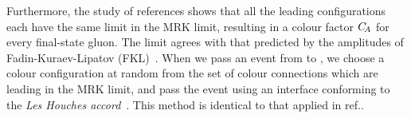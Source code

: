 Furthermore, the study of references \cite{DelDuca:1993pp,DelDuca:1995zy} shows
that all the leading configurations each have the same limit in the
MRK limit, resulting in a colour
factor $C_{\!A}$ for every final-state gluon. The limit agrees with that
predicted by the amplitudes of Fadin-Kuraev-Lipatov (FKL)~\cite{Kuraev:1976ge}.
When we pass an event from \HEJ to \py, we choose a
colour configuration at random from the set of colour connections which are
leading in the MRK limit, and pass the event using an interface conforming
to the \emph{Les Houches accord}~\cite{Boos:2001cv}. This method is identical
to that applied in ref.\@ \cite{Andersen:2011zd}.


%


